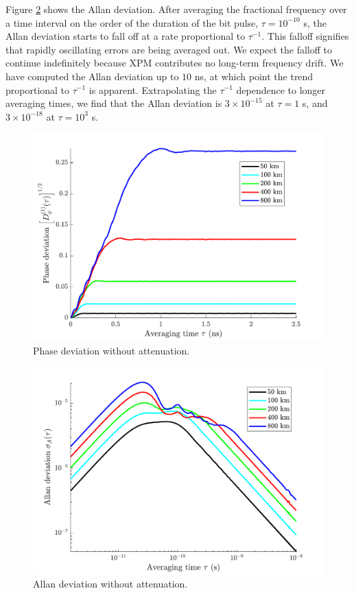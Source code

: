 Figure \ref{fig:NAAllanDev} shows the Allan deviation. After averaging the fractional frequency over a time interval on the order of the duration of the bit pulse, $\tau = 10^{-10}$ s, the Allan deviation starts to fall off at a rate proportional to $\tau^{-1}$. This falloff signifies that rapidly oscillating errors are being averaged out. We expect the falloff to continue indefinitely because XPM contributes no long-term frequency drift. We have computed the Allan deviation up to $10$ ns, at which point the trend proportional to $\tau^{-1}$ is apparent. Extrapolating the $\tau^{-1}$ dependence to longer averaging times, we find that the Allan deviation is $3\times 10^{-15}$ at $\tau = 1$ s, and $3\times 10^{-18}$ at $\tau=10^3$ s.

%
\begin{figure}[htb]
	\raggedright
	\includegraphics[scale=0.8]{img/NAPhaseStability}
	\renewcommand{\baselinestretch}{1}
	\small\normalsize
	\caption{Phase deviation without attenuation.} \label{fig:NAPhaseStability}
\end{figure}
\renewcommand{\baselinestretch}{2}
\small\normalsize

%
\begin{figure}[htb]
	\raggedright
	\includegraphics[scale=0.8]{img/NAAllanDev}
	\renewcommand{\baselinestretch}{1}
	\small\normalsize
	\caption{Allan deviation without attenuation.} \label{fig:NAAllanDev}
\end{figure}
\renewcommand{\baselinestretch}{2}
\small\normalsize


